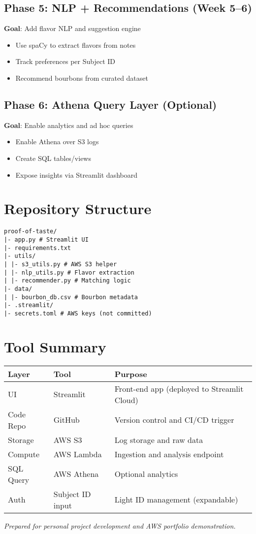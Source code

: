 \documentclass[12pt]{article}
\begin{document}
\subsection*{Phase 5: NLP + Recommendations (Week 5--6)}
\textbf{Goal}: Add flavor NLP and suggestion engine
\begin{itemize}
\item Use spaCy to extract flavors from notes
\item Track preferences per Subject ID
\item Recommend bourbons from curated dataset
\end{itemize}

\subsection*{Phase 6: Athena Query Layer (Optional)}
\textbf{Goal}: Enable analytics and ad hoc queries
\begin{itemize}
\item Enable Athena over S3 logs
\item Create SQL tables/views
\item Expose insights via Streamlit dashboard
\end{itemize}

\section*{Repository Structure}
\begin{verbatim}
proof-of-taste/
|- app.py # Streamlit UI
|- requirements.txt
|- utils/
| |- s3_utils.py # AWS S3 helper
| |- nlp_utils.py # Flavor extraction
| |- recommender.py # Matching logic
|- data/
| |- bourbon_db.csv # Bourbon metadata
|- .streamlit/
|- secrets.toml # AWS keys (not committed)
\end{verbatim}

\section*{Tool Summary}
\begin{center}
\begin{tabular}{|l|l|l|}
\hline
\textbf{Layer} & \textbf{Tool} & \textbf{Purpose} \\
\hline
UI & Streamlit & Front-end app (deployed to Streamlit Cloud) \\
Code Repo & GitHub & Version control and CI/CD trigger \\
Storage & AWS S3 & Log storage and raw data \\
Compute & AWS Lambda & Ingestion and analysis endpoint \\
SQL Query & AWS Athena & Optional analytics \\
Auth & Subject ID input & Light ID management (expandable) \\
\hline
\end{tabular}
\end{center}

\vspace{1em}
\noindent\textit{Prepared for personal project development and AWS portfolio demonstration.}
\end{document}
